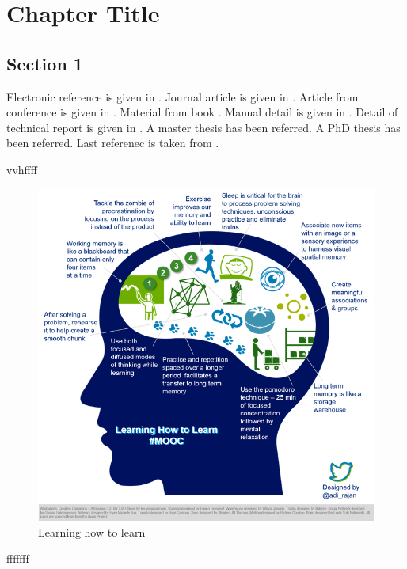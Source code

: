 
\chapter{Chapter Title}
\label{ch:INTR}
\section{Section 1}
Electronic reference is given in \cite{sh07}. Journal article is given in \cite{odo95}. Article from conference is given in \cite{gs97}. Material from book \cite{cu72}. Manual detail is given in \cite{mo96}. Detail of technical report is given in \cite{jrc87}. A master thesis \cite{ka99} has been referred. A PhD thesis \cite{li2000} has been referred. Last referenec is taken from \cite{ro94}.
\begin{definition}
vvhffff
\end{definition}

\begin{figure}[bpht]
\includegraphics{Chapter1/LHTL}
\caption{Learning how to learn}
\end{figure}

\begin{definition}
fffffff
\end{definition}

